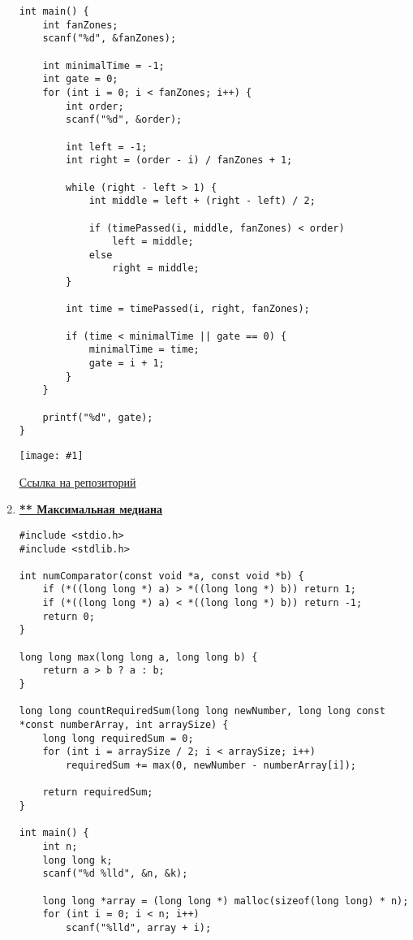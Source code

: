\documentclass[a4paper,14pt]{extarticle}
\newcommand\codeforcesresult[1]{
    \begin{center}
        \texttt{[image: \#1]}
    \end{center}
}
\begin{document}
\begin{enumerate}
\begin{verbatim}
int main() {
    int fanZones;
    scanf("%d", &fanZones);

    int minimalTime = -1;
    int gate = 0;
    for (int i = 0; i < fanZones; i++) {
        int order;
        scanf("%d", &order);

        int left = -1;
        int right = (order - i) / fanZones + 1;

        while (right - left > 1) {
            int middle = left + (right - left) / 2;

            if (timePassed(i, middle, fanZones) < order)
                left = middle;
            else
                right = middle;
        }

        int time = timePassed(i, right, fanZones);

        if (time < minimalTime || gate == 0) {
            minimalTime = time;
            gate = i + 1;
        }
    }

    printf("%d", gate);
}
\end{verbatim}
\codeforcesresult{/codeforceresults/996B}
\href{https://github.com/IAmProgrammist/programming-and-algorithmization-basics/blob/c/lab10/14.c}{\underline{Ссылка на репозиторий}}

\newpage
\item \href{https://codeforces.com/problemset/problem/1201/C}{\textbf{** Максимальная медиана}}
\begin{verbatim}
#include <stdio.h>
#include <stdlib.h>

int numComparator(const void *a, const void *b) {
    if (*((long long *) a) > *((long long *) b)) return 1;
    if (*((long long *) a) < *((long long *) b)) return -1;
    return 0;
}

long long max(long long a, long long b) {
    return a > b ? a : b;
}

long long countRequiredSum(long long newNumber, long long const *const numberArray, int arraySize) {
    long long requiredSum = 0;
    for (int i = arraySize / 2; i < arraySize; i++)
        requiredSum += max(0, newNumber - numberArray[i]);

    return requiredSum;
}

int main() {
    int n;
    long long k;
    scanf("%d %lld", &n, &k);

    long long *array = (long long *) malloc(sizeof(long long) * n);
    for (int i = 0; i < n; i++)
        scanf("%lld", array + i);


\end{verbatim}
\end{enumerate}
\end{document}
